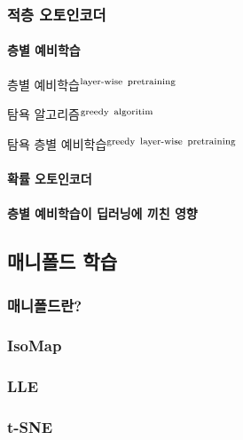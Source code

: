 \documentclass [12pt] {oblivoir}
\let\oldsubsubsection=\subsubsection
\renewcommand{\subsubsection}
{
  \filbreak
  \oldsubsubsection
}
\begin{document}
\subsubsection{적층 오토인코더}

\paragraph*{층별 예비학습}\mbox{}

층별 예비학습$^{\text{layer-wise\, pretraining}}$

탐욕 알고리즘$^{\text{greedy\, algoritim}}$

탐욕 층별 예비학습$^{\text{greedy\, layer-wise\, pretraining}}$

\vspace{3mm}

\paragraph*{확률 오토인코더}\mbox{}

\vspace{3mm}

\paragraph*{층별 예비학습이 딥러닝에 끼친 영향}\mbox{}

\vspace{3mm}

\subsection{매니폴드 학습}

\subsubsection{매니폴드란?}

\subsubsection{IsoMap}

\subsubsection{LLE}

\subsubsection{t-SNE}
\end{document}
